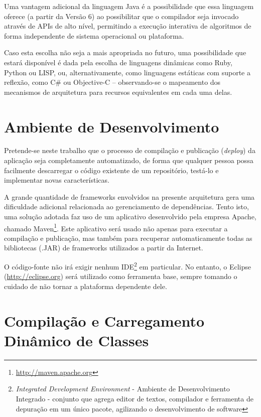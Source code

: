 \documentclass{abnt}
\begin{document}
	Uma vantagem adicional da linguagem Java é a possibilidade que essa linguagem oferece (a partir da Versão 6) ao possibilitar que o compilador seja invocado através de APIs de alto nível, permitindo a execução interativa de algoritmos de forma independente de sistema operacional ou plataforma.

	Caso esta escolha não seja a mais apropriada no futuro, uma possibilidade que estará disponível é dada pela escolha de linguagens dinâmicas como Ruby, Python ou LISP, ou, alternativamente, como linguagens estáticas com suporte a reflexão, como C\# ou Objective-C – observando-se o mapeamento dos mecanismos de arquitetura para recursos equivalentes em cada uma delas.

\section{Ambiente de Desenvolvimento}

	Pretende-se neste trabalho que o processo de compilação e publicação (\textit{deploy}) da aplicação seja completamente automatizado, de forma que qualquer pessoa possa facilmente descarregar o código existente de um repositório, testá-lo e implementar novas características.

	A grande quantidade de frameworks envolvidos na presente arquitetura gera uma dificuldade adicional relacionada ao gerenciamento de dependências. Tento isto, uma solução adotada faz uso de um aplicativo desenvolvido pela empresa Apache, chamado  Maven\footnote{\url{http://maven.apache.org}}. Este aplicativo será usado não apenas para executar a compilação e publicação, mas também para recuperar automaticamente todas as bibliotecas (.JAR) de frameworks utilizados a partir da Internet.

	O código-fonte não irá exigir nenhum IDE\footnote{\textit{Integrated Development Environment} - Ambiente de Desenvolvimento Integrado - conjunto que agrega editor de textos, compilador e ferramenta de depuração em um único pacote, agilizando o desenvolvimento de software} em particular. No entanto, o Eclipse (\url{http://eclipse.org}) será utilizado como ferramenta base, sempre tomando o cuidado de não tornar a plataforma dependente dele. 

\section{Compilação e Carregamento Dinâmico de Classes}
\label{explicacao_compilacao}
\end{document}
